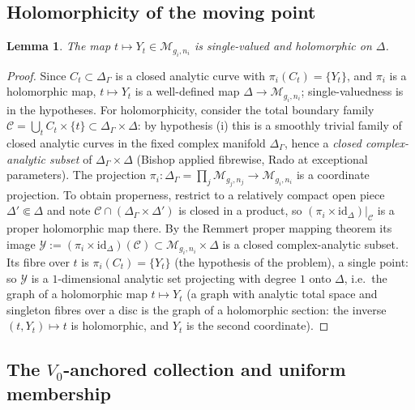 \documentclass[11pt]{article}
\newcommand{\M}{\mathcal{M}}
\newcommand{\id}{\mathrm{id}}
\newtheorem{lem}[thm]{Lemma}
\theoremstyle{definition}
\theoremstyle{remark}
\begin{document}
\subsection{Holomorphicity of the moving point}

\begin{lem}\label{lem:analytic}
The map $t \mapsto Y_t \in \M_{g_i,n_i}$ is single-valued and holomorphic
on $\Delta$.
\end{lem}

\begin{proof}
Since $C_t \subset \Delta_\Gamma$ is a closed analytic curve with
$\pi_i(C_t) = \{Y_t\}$, and $\pi_i$ is a holomorphic map,
$t \mapsto Y_t$ is a well-defined map $\Delta \to \M_{g_i,n_i}$;
single-valuedness is in the hypotheses. For holomorphicity, consider the
total boundary family
$\mathcal{C} = \bigcup_t C_t \times \{t\} \subset \Delta_\Gamma \times
\Delta$: by hypothesis (i) this is a smoothly trivial family of closed
analytic curves in the fixed complex manifold $\Delta_\Gamma$, hence a
\emph{closed complex-analytic subset} of $\Delta_\Gamma \times \Delta$
(Bishop applied fibrewise, Rado at exceptional parameters). The
projection $\pi_i : \Delta_\Gamma = \prod_j \M_{g_j,n_j} \to
\M_{g_i,n_i}$ is a coordinate projection. To obtain properness,
restrict to a relatively compact open piece
$\Delta' \Subset \Delta$ and note $\mathcal C \cap (\Delta_\Gamma
\times \Delta')$ is closed in a product, so
$(\pi_i \times \id_\Delta)|_{\mathcal C}$ is a proper holomorphic map
there. By the Remmert proper mapping theorem its image
$\mathcal Y := (\pi_i\times\id_\Delta)(\mathcal C) \subset
\M_{g_i,n_i} \times \Delta$ is a closed complex-analytic subset. Its
fibre over $t$ is $\pi_i(C_t) = \{Y_t\}$ (the hypothesis of the
problem), a single point: so $\mathcal Y$ is a $1$-dimensional analytic
set projecting with degree $1$ onto $\Delta$, i.e.\ the graph of a
holomorphic map $t \mapsto Y_t$ (a graph with analytic total space and
singleton fibres over a disc is the graph of a holomorphic section: the
inverse $(t, Y_t) \mapsto t$ is holomorphic, and $Y_t$ is the second
coordinate).
\end{proof}

\subsection{The $V_0$-anchored collection and uniform membership}
\end{document}
